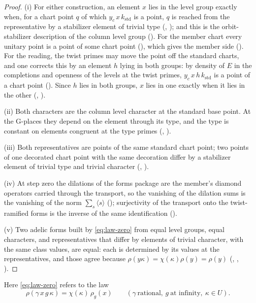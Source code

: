 \documentclass[11pt]{article}
\newcommand{\rT}{\rho}
\theoremstyle{definition}
\theoremstyle{remark}
\begin{document}
\begin{proof}
(i) For either construction, an element $x$ lies in the level group exactly when, for a chart point $q$ of which $y_c\,x\,k_{\mathrm{std}}$ is a point, $q$ is reached from the representative by a stabilizer element of trivial type (, ); and this is the orbit-stabilizer description of the column level group (). For the member chart every unitary point is a point of some chart point (), which gives the member side (). For the reading, the twist primes may move the point off the standard charts, and one corrects this by an element $h$ lying in both groups: by density of $E$ in the completions and openness of the levels at the twist primes, $y_c\,x\,h\,k_{\mathrm{std}}$ is a point of a chart point (). Since $h$ lies in both groups, $x$ lies in one exactly when it lies in the other (, ).

(ii) Both characters are the column level character at the standard base point. At the G-places they depend on the element through its type, and the type is constant on elements congruent at the type primes (, ).

(iii) Both representatives are points of the same standard chart point; two points of one decorated chart point with the same decoration differ by a stabilizer element of trivial type and trivial character (, ).

(iv) At step zero the dilations of the forms package are the member's diamond operators carried through the transport, so the vanishing of the dilation sums is the vanishing of the norm $\sum_s\langle s\rangle$ (); surjectivity of the transport onto the twist-ramified forms is the inverse of the same identification ().

(v) Two adelic forms built by \eqref{eq:law-zero} from equal level groups, equal characters, and representatives that differ by elements of trivial character, with the same class values, are equal: each is determined by its values at the representatives, and those agree because $\rT(y\kappa)=\chi(\kappa)\rT(y)=\rT(y)$ (, , ).
\end{proof}

Here \eqref{eq:law-zero} refers to the law
\begin{equation}\label{eq:law-zero}
\rT(\gamma\,x\,g\,\kappa)=\chi(\kappa)\,\rT_{g}(x)\qquad(\gamma\ \text{rational},\ g\ \text{at infinity},\ \kappa\in U).
\end{equation}
\end{document}
